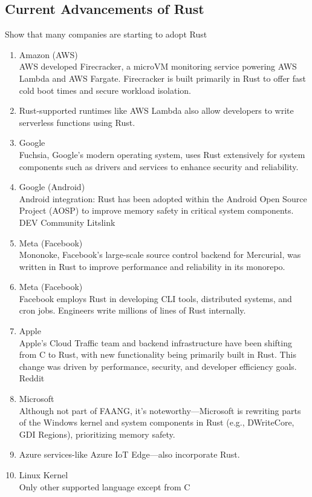 \documentclass{article}
\begin{document}
\subsection{Current Advancements of Rust}
Show that many companies are starting to adopt Rust
\begin{enumerate}
    \item Amazon (AWS)\\ AWS developed Firecracker, a microVM monitoring service powering
        AWS Lambda and AWS
        Fargate. Firecracker is built primarily in Rust to offer fast cold boot times and
        secure workload
        isolation.
    \item Rust-supported runtimes like AWS Lambda also allow developers to write
        serverless functions using
        Rust.
    \item Google\\ Fuchsia, Google's modern operating system, uses Rust extensively for
        system components
        such as drivers and services to enhance security and reliability.
    \item Google (Android)\\ Android integration: Rust has been adopted within the
        Android Open Source
        Project (AOSP) to improve memory safety in critical system components. DEV
        Community Litslink
    \item Meta (Facebook)\\ Mononoke, Facebook’s large-scale source control backend for
        Mercurial, was
        written in Rust to improve performance and reliability in its monorepo.
    \item Meta (Facebook)\\ Facebook employs Rust in developing CLI tools, distributed
        systems, and cron
        jobs. Engineers write millions of lines of Rust internally.
    \item Apple\\ Apple’s Cloud Traffic team and backend infrastructure have been
        shifting from C to Rust,
        with new functionality being primarily built in Rust. This change was driven by performance,
        security, and developer efficiency goals. Reddit
    \item Microsoft\\ Although not part of FAANG, it’s noteworthy—Microsoft is rewriting
        parts of the Windows
        kernel and system components in Rust (e.g., DWriteCore, GDI Regions),
        prioritizing memory safety.
    \item Azure services-like Azure IoT Edge—also incorporate Rust.
    \item Linux Kernel\\ Only other supported language except from C
\end{enumerate}
\end{document}
